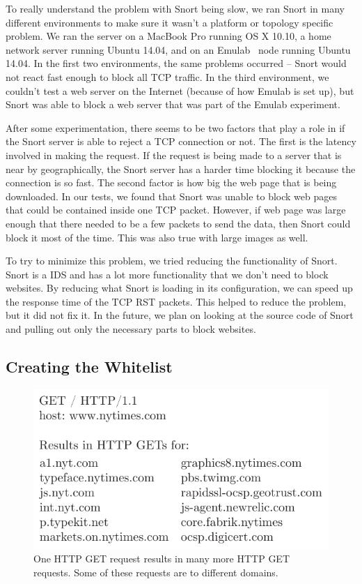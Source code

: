 To really understand the problem with Snort being slow, we ran Snort in many
different environments to make sure it wasn't a platform or topology specific
problem. We ran the server on a MacBook Pro running OS X 10.10, a home network
server running Ubuntu 14.04, and on an Emulab~\cite{emulab} node running Ubuntu
14.04. In the first two environments, the same problems occurred -- Snort would
not react fast enough to block all TCP traffic. In the third environment, we
couldn't test a web server on the Internet (because of how Emulab is set up),
but Snort was able to block a web server that was part of the Emulab
experiment.

After some experimentation, there seems to be two factors that play a role in
if the Snort server is able to reject a TCP connection or not. The first is the
latency involved in making the request. If the request is being made to a
server that is near by geographically, the Snort server has a harder time
blocking it because the connection is so fast. The second factor is how big the
web page that is being downloaded. In our tests, we found that Snort was unable
to block web pages that could be contained inside one TCP packet. However, if
web page was large enough that there needed to be a few packets to send the
data, then Snort could block it most of the time. This was also true with large
images as well.

To try to minimize this problem, we tried reducing the functionality of Snort.
Snort is a IDS and has a lot more functionality that we don't need to block
websites. By reducing what Snort is loading in its configuration, we can speed
up the response time of the TCP RST packets. This helped to reduce the problem,
but it did not fix it. In the future, we plan on looking at the source code of
Snort and pulling out only the necessary parts to block websites.


\vspace{20mm}
\subsection{Creating the Whitelist}

\begin{figure}[!tb]
    \centering
    \includegraphics[width=\columnwidth]{figures/http_get}
    \caption{One HTTP GET request results in many more HTTP GET requests. Some
    of these requests are to different domains.}
    \label{fig:http_get}
\end{figure}

